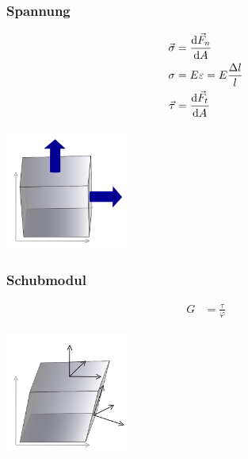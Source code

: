 \begin{multicols}{2}{}
\subsubsection*{Spannung}
\begin{align*}
\vec{\sigma}&=\frac{\mathop{}\!\mathrm{d}\vec{F}_n}{\mathop{}\!\mathrm{d} A}\\
\sigma&=E \varepsilon=E\frac{\Delta l}{l}\\
\vec{\tau}&= \frac{\mathop{}\!\mathrm{d}\vec{F}_t}{\mathop{}\!\mathrm{d} A}
\end{align*}
\hfill

\begin{center}
 \includegraphics[width=40mm,height=40mm,keepaspectratio=true]{./Physik/Bilder/Spannung.png}
\end{center}
\end{multicols}


\subsubsection*{Schubmodul}
\begin{multicols}{2}{}
\begin{align*}
G&=\frac{\tau}{\varphi}
\end{align*}
\hfill

\begin{center}
 \includegraphics[width=40mm,height=40mm,keepaspectratio=true]{./Physik/Bilder/Tangentialspannung.png}
\end{center}
\end{multicols}



